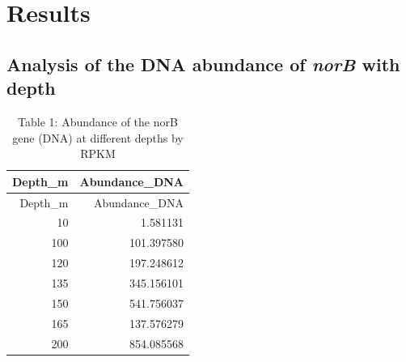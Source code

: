\documentclass[11 pt,]{article}
\newenvironment{Shaded}{\begin{snugshade}}{\end{snugshade}}
\newcommand{\KeywordTok}[1]{\textcolor[rgb]{0.13,0.29,0.53}{\textbf{#1}}}
\newcommand{\DataTypeTok}[1]{\textcolor[rgb]{0.13,0.29,0.53}{#1}}
\newcommand{\StringTok}[1]{\textcolor[rgb]{0.31,0.60,0.02}{#1}}
\newcommand{\OperatorTok}[1]{\textcolor[rgb]{0.81,0.36,0.00}{\textbf{#1}}}
\newcommand{\NormalTok}[1]{#1}
\begin{document}
\section{Results}\label{results}

\subsection{\texorpdfstring{Analysis of the DNA abundance of \emph{norB}
with
depth}{Analysis of the DNA abundance of norB with depth}}\label{analysis-of-the-dna-abundance-of-norb-with-depth}

\begin{Shaded}
\end{Shaded}

\begin{longtable}[]{@{}rr@{}}
\caption{Table 1: Abundance of the norB gene (DNA) at different depths
by RPKM}\tabularnewline
\toprule
Depth\_m & Abundance\_DNA\tabularnewline
\midrule
\endfirsthead
\toprule
Depth\_m & Abundance\_DNA\tabularnewline
\midrule
\endhead
10 & 1.581131\tabularnewline
100 & 101.397580\tabularnewline
120 & 197.248612\tabularnewline
135 & 345.156101\tabularnewline
150 & 541.756037\tabularnewline
165 & 137.576279\tabularnewline
200 & 854.085568\tabularnewline
\bottomrule
\end{longtable}
\end{document}

